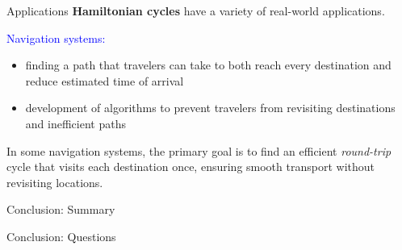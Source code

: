 \documentclass[pdf]{beamer}
\begin{document}
    \begin{frame}{Applications}
        \textbf{Hamiltonian cycles} have a variety of real-world applications.

        \vspace{10px}

        \textcolor{blue}{Navigation systems:}
        \begin{itemize}
            \item finding a path that travelers can take to both reach every destination and reduce estimated time of arrival
            \item development of algorithms to prevent travelers from revisiting destinations and inefficient paths
        \end{itemize}
        
        \vspace{20px}

        In some navigation systems, the primary goal is to find an efficient \emph{round-trip} cycle that visits each destination once, ensuring smooth transport without revisiting locations.



    \end{frame}

    \begin{frame}{Conclusion: Summary}

    \end{frame}

    \begin{frame}{Conclusion: Questions}

    \end{frame}
\end{document}
